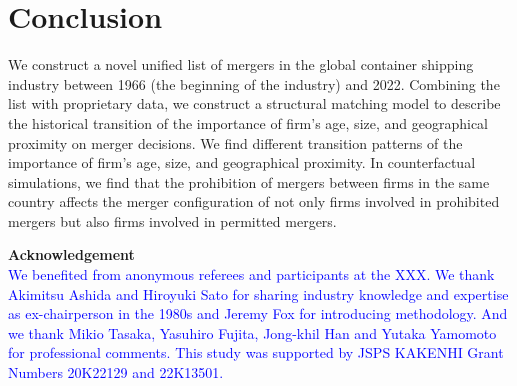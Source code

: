 \documentclass[10pt]{article}
\begin{document}
\section{Conclusion}\label{sec:conclusion}
We construct a novel unified list of mergers in the global container shipping industry between 1966 (the beginning of the industry) and 2022. 
Combining the list with proprietary data, we construct a structural matching model to describe the historical transition of the importance of firm's age, size, and geographical proximity on merger decisions. 
We find different transition patterns of the importance of firm's age, size, and geographical proximity.
In counterfactual simulations, we find that the prohibition of mergers between firms in the same country affects the merger configuration of not only firms involved in prohibited mergers but also firms involved in permitted mergers.

\newpage

\textbf{Acknowledgement} \\
\textcolor{blue}{We benefited from anonymous referees and participants at the XXX. We thank Akimitsu Ashida and Hiroyuki Sato for sharing industry knowledge and expertise as ex-chairperson in the 1980s and Jeremy Fox for introducing methodology. And we thank Mikio Tasaka, Yasuhiro Fujita, Jong-khil Han and Yutaka Yamomoto for professional comments. This study was supported by JSPS KAKENHI Grant Numbers 20K22129 and 22K13501. }





\end{document}
